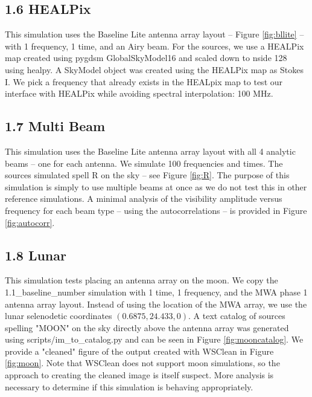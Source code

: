 \documentclass{article}
\begin{document}
\subsection*{1.6 HEALPix}

This simulation uses the Baseline Lite antenna array layout -- Figure \ref{fig:bllite} -- with 1 frequency, 1 time, and an Airy beam. For the sources, we use a HEALPix map created using pygdsm GlobalSkyModel16 and scaled down to nside 128 using healpy. A SkyModel object was created using the HEALPix map as Stokes I. We pick a frequency that already exists in the HEALpix map to test our interface with HEALPix while avoiding spectral interpolation: 100 MHz.
\subsection*{1.7 Multi Beam}

This simulation uses the Baseline Lite antenna array layout with all 4 analytic beams -- one for each antenna. We simulate 100 frequencies and times. The sources simulated spell R on the sky -- see Figure \ref{fig:R}. The purpose of this simulation is simply to use multiple beams at once as we do not test this in other reference simulations. A minimal analysis of the visibility amplitude versus frequency for each beam type -- using the autocorrelations -- is provided in Figure \ref{fig:autocorr}.
\subsection*{1.8 Lunar}

This simulation tests placing an antenna array on the moon. We copy the 1.1\_baseline\_number simulation with 1 time, 1 frequency, and the MWA phase 1 antenna array layout. Instead of using the location of the MWA array, we use the lunar selenodetic coordinates $(0.6875, 24.433, 0)$. A text catalog of sources spelling "MOON" on the sky directly above the antenna array was generated using scripts/im\_to\_catalog.py and can be seen in Figure \ref{fig:mooncatalog}. We provide a "cleaned" figure of the output created with WSClean in Figure \ref{fig:moon}. Note that WSClean does not support moon simulations, so the approach to creating the cleaned image is itself suspect. More analysis is necessary to determine if this simulation is behaving appropriately.
\end{document}
